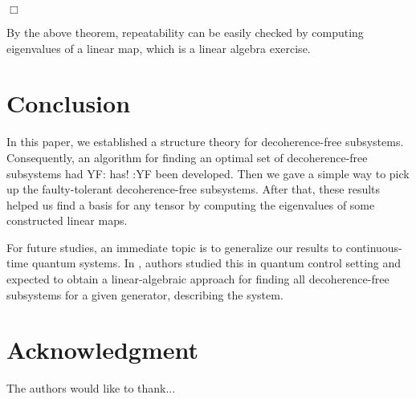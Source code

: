 \documentclass[journal]{IEEEtran}
\newcommand{\authorComment}[3]{\color{#1}#2: {#3} :#2\color{black}}
\newcommand{\yf}[1]{\authorComment{blue}{YF}{#1}}
\begin{document}
\hfill $\Box$

By the above theorem, repeatability  can be easily checked by computing eigenvalues of a linear map, which is a linear algebra exercise.  
\section{Conclusion}
In this paper, we established a structure theory for decoherence-free subsystems. Consequently, an algorithm for finding an optimal set of decoherence-free subsystems had \yf{has!} been developed. Then we gave a simple way to pick up the faulty-tolerant decoherence-free subsystems. After that, these results helped us find a basis for any tensor by computing the eigenvalues of some constructed linear maps. 

For future studies, an immediate topic is to generalize our results to continuous-time quantum systems. In \cite{ticozzi2008quantum}, authors  studied this in quantum control setting and expected to obtain a linear-algebraic approach for finding all decoherence-free subsystems  for a given generator, describing the system.
\section*{Acknowledgment}


The authors would like to thank...










%
%
%
\end{document}

